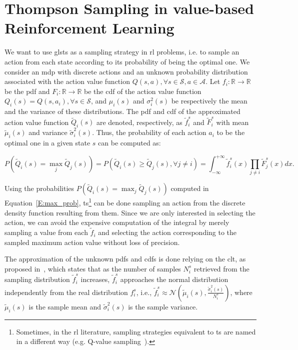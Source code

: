 \section{Thompson Sampling in value-based Reinforcement Learning}\label{S:tsrl}
We want to use gls{ts} as a sampling strategy in \gls{rl} problems, i.e. to sample an action from each state according to its probability of being the optimal one.
We consider an \gls{mdp} with discrete actions and an unknown probability distribution associated with the action value function $Q(s,a), \forall s \in \mathcal{S}, a \in \mathcal{A}$. Let $f_i:\mathbb{R} \rightarrow \mathbb{R}$ be the \gls{pdf} and $F_i:\mathbb{R} \rightarrow \mathbb{R}$ be the \gls{cdf} of the action value function $Q_i(s) = Q(s, a_i), \forall s \in \mathcal{S}$, and $\mu_i(s)$ and $\sigma^2_i(s)$ be respectively the mean and the variance of these distributions. The \gls{pdf} and \gls{cdf} of the approximated action value function $\tilde{Q}_i(s)$ are denoted, respectively, as $\tilde{f}_i^s$ and $\tilde{F}_i^s$ with mean $\tilde{\mu}_i(s)$ and variance $\tilde{\sigma}_i^2(s)$. Thus, the probability of each action $a_i$ to be the optimal one in a given state $s$ can be computed as:

\begin{equation}\label{E:max_prob}
 P\left(\tilde{Q}_i(s) = \max_j \tilde{Q}_j(s)\right) = P\left(\tilde{Q}_i(s) \geq \tilde{Q}_j(s), \forall j \neq i\right) = \int^{+\infty}_{-\infty} \tilde{f}_i^s(x) \prod_{j \neq i} \tilde{F}_j^s(x) dx.
\end{equation}

Using the probabilities $P\left(\tilde{Q}_i(s) = \max_j \tilde{Q}_j(s)\right)$ computed in Equation~\ref{E:max_prob}, \gls{ts}\footnote{Sometimes, in the \gls{rl} literature, sampling strategies equivalent to \gls{ts} are named in a different way (e.g. Q-value sampling~\cite{dearden1998bayesian}).} can be done sampling an action from the discrete density function resulting from them. Since we are only interested in selecting the action, we can avoid the expensive computation of the integral by merely sampling a value from each $\tilde{f}_i$ and selecting the action corresponding to the sampled maximum action value without loss of precision.

The approximation of the unknown \glspl{pdf} and \glspl{cdf} is done relying on the \gls{clt}, as proposed in~\cite{d2016estimating}, which states that as the number of samples $N_i^s$ retrieved from the sampling distribution $\tilde{f}_i^s$ increases, $\tilde{f}_i^s$ approaches the normal distribution independently from the real distribution $f_i^s$, i.e., $\tilde{f}_i^s \approx \mathcal{N}\left(\tilde{\mu}_i(s), \frac{\tilde{\sigma}^2_i(s)}{N_i^s}\right)$, where $\tilde{\mu}_i(s)$ is the sample mean and $\tilde{\sigma}^2_i(s)$ is the sample variance. 

